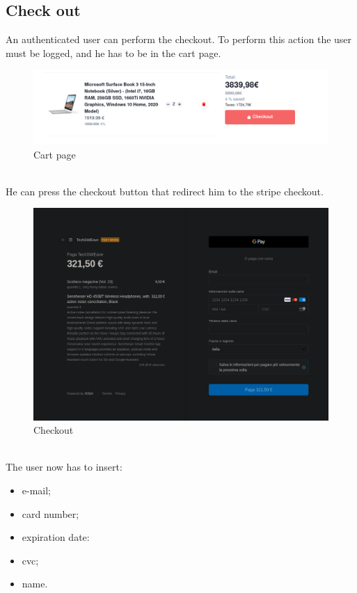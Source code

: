 \subsection{Check out}
An authenticated user can perform the checkout. To perform this action the user must be logged, and he has to be in the cart page.
\begin{figure}[!ht]
    \caption{Cart page}
    \vspace{10px}
    \includegraphics[scale=0.35]{../../../../Images/userManual/cart.png}
    \centering
\end{figure}
\\
He can press the checkout button that redirect him to the stripe checkout.
\begin{figure}[!ht]
    \caption{Checkout}
    \vspace{10px}
    \includegraphics[scale=0.3]{../../../../Images/userManual/checkout.png}
    \centering
\end{figure}
\\
The user now has to insert:
\begin{itemize}
    \item e-mail;
    \item card number;
    \item expiration date:
    \item cvc;
    \item name.
\end{itemize}
